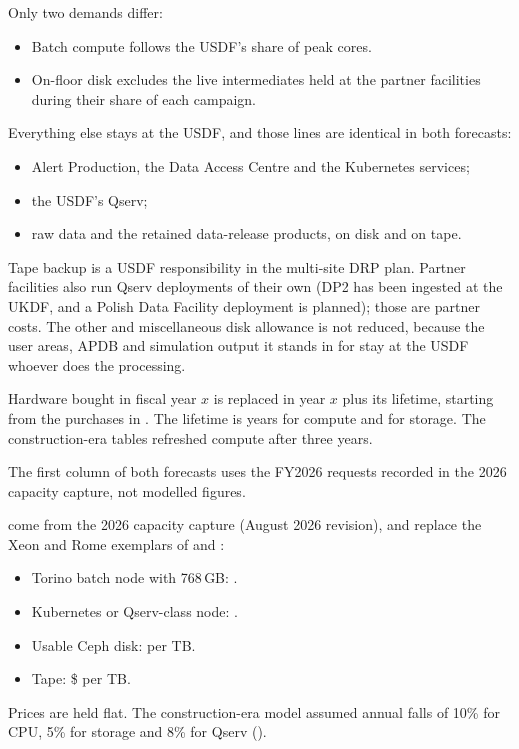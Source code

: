 Only two demands differ:
\begin{itemize}
\item Batch compute follows the USDF's share of peak cores.
\item On-floor disk excludes the live intermediates held at the partner
      facilities during their share of each campaign.
\end{itemize}
Everything else stays at the USDF, and those lines are identical in both
forecasts:
\begin{itemize}
\item Alert Production, the Data Access Centre and the Kubernetes services;
\item the USDF's Qserv;
\item raw data and the retained data-release products, on disk and on tape.
\end{itemize}
Tape backup is a USDF responsibility in the multi-site DRP plan. Partner
facilities also run Qserv deployments of their own (DP2 has been ingested at
the UKDF, and a Polish Data Facility deployment is planned); those are partner
costs. The other and miscellaneous disk allowance is not reduced, because the
user areas, APDB and simulation output it stands in for stay at the USDF
whoever does the processing.

Hardware bought in fiscal year $x$ is replaced in year $x$ plus its lifetime,
starting from the purchases in . The lifetime is
\smLifeCompute{} years for compute and \smLifeStorage{} for storage. The
construction-era tables refreshed compute after three years.

The first column of both forecasts uses the FY2026 requests recorded in the
2026 capacity capture, not modelled figures.

 come from the 2026 capacity capture (August 2026
revision), and replace the Xeon and Rome exemplars of
 and :
\begin{itemize}
\item Torino batch node with 768\,GB: \smTorinoUSD{}.
\item Kubernetes or Qserv-class node: \smKeightsUSD{}.
\item Usable Ceph disk: \smCephPerTB{} per TB.
\item Tape: \$\smTapePerTB{} per TB.
\end{itemize}
Prices are held flat. The construction-era model assumed annual falls of 10\%
for CPU, 5\% for storage and 8\% for Qserv ().

